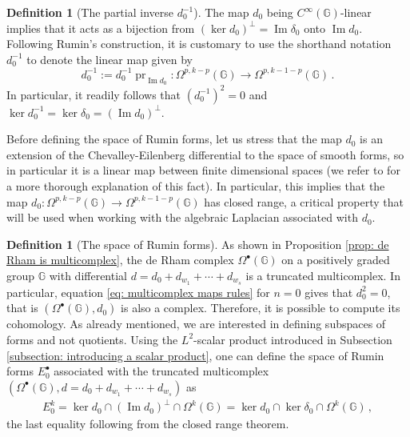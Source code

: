 \documentclass[dvipsnames]{amsart}
\theoremstyle{definition}
\newtheorem{definition}[theorem]{Definition}
\theoremstyle{definition}
\numberwithin{equation}{section}
\newcommand{\G}{\mathbb{G}}
\begin{document}
\begin{definition}[The partial inverse $d_0^{-1}$]\label{def: d_0^{-1}} The map $d_0$ being $C^\infty(\G)$-linear implies that it acts as a bijection from $\left(\ker d_0\right)^\perp=\operatorname{Im}\delta_0$ onto $\operatorname{Im}d_0$. Following Rumin's construction, it is customary to use the shorthand notation $d_0^{-1}$ to denote the linear map given by $$d_0^{-1}:=d_0^{-1}\operatorname{pr}_{\operatorname{Im}d_0}\colon\Omega^{p,k-p}(\G)\longrightarrow\Omega^{p,k-1-p}(\G)\,.$$
In particular, it readily follows that $(d_0^{-1})^2=0$ and $\ker d_0^{-1}=\ker\delta_0=\left(\operatorname{Im}d_0\right)^\perp$.
\end{definition}
Before defining the space of Rumin forms, let us stress that the map $d_0$ is an extension of the Chevalley-Eilenberg differential to the space of smooth forms, so in particular it is a linear map between finite dimensional spaces (we refer to \cite{F+T1} for a more thorough explanation of this fact). In particular, this implies that the map $d_0\colon\Omega^{p,k-p}(\G)\to\Omega^{p,k-1-p}(\G)$ has closed range, a critical property that will be used when working with the algebraic Laplacian associated with $d_0$.
\begin{definition}[The space of Rumin forms] As shown in Proposition \ref{prop: de Rham is multicomplex}, the de Rham complex $\Omega^\bullet(\G)$ on a positively graded group $\G$ with differential $d=d_0+d_{w_1}+\cdots+d_{w_s}$ is a truncated multicomplex. In particular, equation \eqref{eq: multicomplex maps rules} for $n=0$ gives that $d_0^2=0$, that is $(\Omega^\bullet(\G),d_0)$ is also a complex. Therefore, it is possible to compute its cohomology. As already mentioned, we are interested in defining subspaces of forms and not quotients. Using the $L^2$-scalar product introduced in Subsection \ref{subsection: introducing a scalar product}, one can define the space of Rumin forms $E_0^\bullet$ associated with the truncated multicomplex $(\Omega^\bullet(\G),d=d_0+d_{w_1}+\cdots+d_{w_s})$ as
\begin{align}\label{eq: Rumin forms defined}
    E_0^k=\ker d_0\cap\left(\operatorname{Im}d_0\right)^\perp\cap\Omega^k(\G)=\ker d_0\cap\ker\delta_0\cap\Omega^k(\G)\,,
\end{align}
the last equality following from the closed range theorem.
\end{definition}
\end{document}
